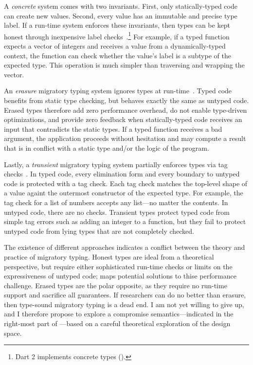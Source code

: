 A \emph{concrete}\/ system comes with two invariants.
First, only statically-typed code can create new values.
Second, every value has an immutable and precise type label.
If a run-time system enforces these invariants, then types can be kept honest
 through inexpensive label checks~\cite{mt-oopsla-2017,wnlov-popl-2010,bmt-ecoop-2010,rat-oopsla-2017}.\footnote{Dart 2 implements concrete types ().}
For example, if a typed function expects a vector of integers and receives
 a value from a dynamically-typed context, the function can check whether the
 value's label is a subtype of the expected type.
This operation is much simpler than traversing and wrapping the vector.

An \emph{erasure}\/ migratory typing system ignores types at run-time~\cite{bat-ecoop-2014,bg-oopsla-1993,s-lisp-1990}.
Typed code benefits from static type checking, but behaves exactly the same
 as untyped code.
Erased types therefore add zero performance overhead, do not enable
 type-driven optimizations, and provide zero feedback
 when statically-typed code receives an input that contradicts the static
 types.
If a typed function receives a bad argument, the application proceeds without
 hesitation and may compute a result that is in conflict with a
 static type and/or the logic of the program.

Lastly, a \emph{transient}\/ migratory typing system partially enforces types
 via tag checks~\cite{vss-popl-2017,v-thesis-2019}.
In typed code, every elimination form and every boundary to untyped code
 is protected with a tag check.
Each tag check matches the top-level shape of a value againt the outermost
 constructor of the expected type.
For example, the tag check for a
 list of numbers accepts any list---no matter the contents.
In untyped code, there are no checks.
Transient types protect typed code from simple
 tag errors such as adding an integer to a function, but they fail
 to protect untyped code from lying types that are not completely checked.

The existence of different approaches indicates a conflict between the theory
 and practice of migratory typing.
Honest types are ideal from a theoretical perspective, but require either
 sophisticated run-time checks or limits on the expressiveness of
 untyped code;  maps potential solutions to
 thise performance challenge.
Erased types are the polar opposite, as they require no run-time support
 and sacrifice all guarantees.
If researchers can do no better than erasure, then
 type-sound migratory typing is a dead end.
I am not yet willing to give up, and I therefore propose to explore a
 compromise semantics---indicated in the right-most part of
 ---based on a careful theoretical exploration of the design space.

